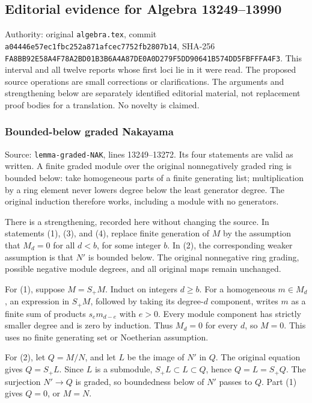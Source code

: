 \subsection{Editorial evidence for Algebra 13249--13990}\label{editorial-evidence-for-algebra-1324913990}

Authority: original \texttt{algebra.tex}, commit \texttt{a04446e57ec1fbc252a871afcec7752fb2807b14}, SHA-256 \texttt{FA8BB92E58A4F78A2BD01B3B6A4A87DE0A0D279F5DD90641B574DD5FBFFFA4F3}. This interval and all twelve reports whose first loci lie in it were read. The proposed source operations are small corrections or clarifications. The arguments and strengthening below are separately identified editorial material, not replacement proof bodies for a translation. No novelty is claimed.

\subsubsection{Bounded-below graded Nakayama}\label{bounded-below-graded-nakayama}

Source: \texttt{lemma-graded-NAK}, lines 13249--13272. Its four statements are valid as written. A finite graded module over the original nonnegatively graded ring is bounded below: take homogeneous parts of a finite generating list; multiplication by a ring element never lowers degree below the least generator degree. The original induction therefore works, including a module with no generators.

There is a strengthening, recorded here without changing the source. In statements (1), (3), and (4), replace finite generation of \(M\) by the assumption that \(M_d=0\) for all \(d<b\), for some integer \(b\). In (2), the corresponding weaker assumption is that \(N'\) is bounded below. The original nonnegative ring grading, possible negative module degrees, and all original maps remain unchanged.

For (1), suppose \(M=S_+M\). Induct on integers \(d\geq b\). For a homogeneous \(m\in M_d\), an expression in \(S_+M\), followed by taking its degree-\(d\) component, writes \(m\) as a finite sum of products \(s_e m_{d-e}\) with \(e>0\). Every module component has strictly smaller degree and is zero by induction. Thus \(M_d=0\) for every \(d\), so \(M=0\). This uses no finite generating set or Noetherian assumption.

For (2), let \(Q=M/N\), and let \(L\) be the image of \(N'\) in \(Q\). The original equation gives \(Q=S_+L\). Since \(L\) is a submodule, \(S_+L\subset L\subset Q\), hence \(Q=L=S_+Q\). The surjection \(N'\to Q\) is graded, so boundedness below of \(N'\) passes to \(Q\). Part (1) gives \(Q=0\), or \(M=N\).

